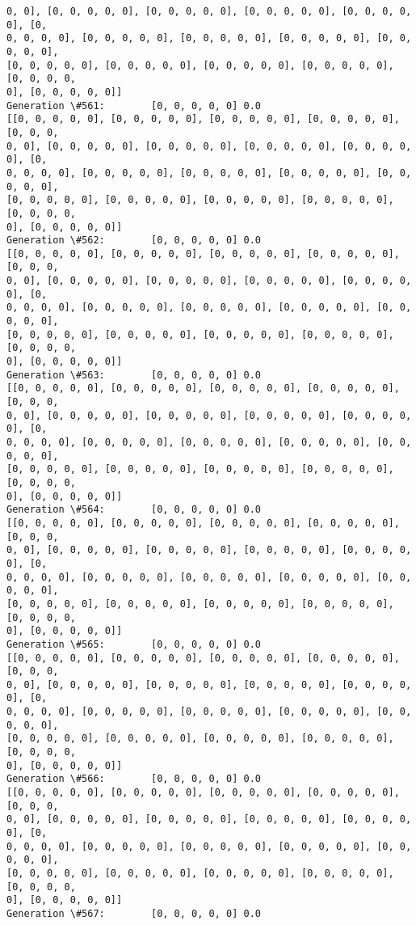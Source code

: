 \documentclass[11pt]{article}
\begin{document}
\begin{Verbatim}[commandchars=\\\{\}]
0, 0], [0, 0, 0, 0, 0], [0, 0, 0, 0, 0], [0, 0, 0, 0, 0], [0, 0, 0, 0, 0], [0,
0, 0, 0, 0], [0, 0, 0, 0, 0], [0, 0, 0, 0, 0], [0, 0, 0, 0, 0], [0, 0, 0, 0, 0],
[0, 0, 0, 0, 0], [0, 0, 0, 0, 0], [0, 0, 0, 0, 0], [0, 0, 0, 0, 0], [0, 0, 0, 0,
0], [0, 0, 0, 0, 0]]
Generation \#561:        [0, 0, 0, 0, 0] 0.0
[[0, 0, 0, 0, 0], [0, 0, 0, 0, 0], [0, 0, 0, 0, 0], [0, 0, 0, 0, 0], [0, 0, 0,
0, 0], [0, 0, 0, 0, 0], [0, 0, 0, 0, 0], [0, 0, 0, 0, 0], [0, 0, 0, 0, 0], [0,
0, 0, 0, 0], [0, 0, 0, 0, 0], [0, 0, 0, 0, 0], [0, 0, 0, 0, 0], [0, 0, 0, 0, 0],
[0, 0, 0, 0, 0], [0, 0, 0, 0, 0], [0, 0, 0, 0, 0], [0, 0, 0, 0, 0], [0, 0, 0, 0,
0], [0, 0, 0, 0, 0]]
Generation \#562:        [0, 0, 0, 0, 0] 0.0
[[0, 0, 0, 0, 0], [0, 0, 0, 0, 0], [0, 0, 0, 0, 0], [0, 0, 0, 0, 0], [0, 0, 0,
0, 0], [0, 0, 0, 0, 0], [0, 0, 0, 0, 0], [0, 0, 0, 0, 0], [0, 0, 0, 0, 0], [0,
0, 0, 0, 0], [0, 0, 0, 0, 0], [0, 0, 0, 0, 0], [0, 0, 0, 0, 0], [0, 0, 0, 0, 0],
[0, 0, 0, 0, 0], [0, 0, 0, 0, 0], [0, 0, 0, 0, 0], [0, 0, 0, 0, 0], [0, 0, 0, 0,
0], [0, 0, 0, 0, 0]]
Generation \#563:        [0, 0, 0, 0, 0] 0.0
[[0, 0, 0, 0, 0], [0, 0, 0, 0, 0], [0, 0, 0, 0, 0], [0, 0, 0, 0, 0], [0, 0, 0,
0, 0], [0, 0, 0, 0, 0], [0, 0, 0, 0, 0], [0, 0, 0, 0, 0], [0, 0, 0, 0, 0], [0,
0, 0, 0, 0], [0, 0, 0, 0, 0], [0, 0, 0, 0, 0], [0, 0, 0, 0, 0], [0, 0, 0, 0, 0],
[0, 0, 0, 0, 0], [0, 0, 0, 0, 0], [0, 0, 0, 0, 0], [0, 0, 0, 0, 0], [0, 0, 0, 0,
0], [0, 0, 0, 0, 0]]
Generation \#564:        [0, 0, 0, 0, 0] 0.0
[[0, 0, 0, 0, 0], [0, 0, 0, 0, 0], [0, 0, 0, 0, 0], [0, 0, 0, 0, 0], [0, 0, 0,
0, 0], [0, 0, 0, 0, 0], [0, 0, 0, 0, 0], [0, 0, 0, 0, 0], [0, 0, 0, 0, 0], [0,
0, 0, 0, 0], [0, 0, 0, 0, 0], [0, 0, 0, 0, 0], [0, 0, 0, 0, 0], [0, 0, 0, 0, 0],
[0, 0, 0, 0, 0], [0, 0, 0, 0, 0], [0, 0, 0, 0, 0], [0, 0, 0, 0, 0], [0, 0, 0, 0,
0], [0, 0, 0, 0, 0]]
Generation \#565:        [0, 0, 0, 0, 0] 0.0
[[0, 0, 0, 0, 0], [0, 0, 0, 0, 0], [0, 0, 0, 0, 0], [0, 0, 0, 0, 0], [0, 0, 0,
0, 0], [0, 0, 0, 0, 0], [0, 0, 0, 0, 0], [0, 0, 0, 0, 0], [0, 0, 0, 0, 0], [0,
0, 0, 0, 0], [0, 0, 0, 0, 0], [0, 0, 0, 0, 0], [0, 0, 0, 0, 0], [0, 0, 0, 0, 0],
[0, 0, 0, 0, 0], [0, 0, 0, 0, 0], [0, 0, 0, 0, 0], [0, 0, 0, 0, 0], [0, 0, 0, 0,
0], [0, 0, 0, 0, 0]]
Generation \#566:        [0, 0, 0, 0, 0] 0.0
[[0, 0, 0, 0, 0], [0, 0, 0, 0, 0], [0, 0, 0, 0, 0], [0, 0, 0, 0, 0], [0, 0, 0,
0, 0], [0, 0, 0, 0, 0], [0, 0, 0, 0, 0], [0, 0, 0, 0, 0], [0, 0, 0, 0, 0], [0,
0, 0, 0, 0], [0, 0, 0, 0, 0], [0, 0, 0, 0, 0], [0, 0, 0, 0, 0], [0, 0, 0, 0, 0],
[0, 0, 0, 0, 0], [0, 0, 0, 0, 0], [0, 0, 0, 0, 0], [0, 0, 0, 0, 0], [0, 0, 0, 0,
0], [0, 0, 0, 0, 0]]
Generation \#567:        [0, 0, 0, 0, 0] 0.0

\end{Verbatim}
\end{document}
